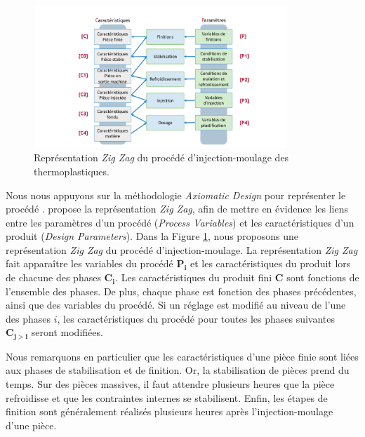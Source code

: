 \begin{figure}[hbtp]
	\centering
	\includegraphics[width=0.85\textwidth,height=\textheight,keepaspectratio]{../Chap1/Figures/Sapristi_ZigZag.pdf}
	\caption{Représentation \textit{Zig Zag} du procédé d'injection-moulage des thermoplastiques.}
	\label{fig:zigzag}
\end{figure}

Nous nous appuyons sur la méthodologie \textit{Axiomatic Design} pour représenter le procédé \cite{suh_principles_1990}.
\citeauthor{suh_principles_1990} propose la représentation \textit{Zig Zag}, afin de mettre en évidence les liens entre les paramètres d'un procédé (\textit{Process Variables}) et les caractéristiques d'un produit (\textit{Design Parameters}).
Dans la Figure \ref{fig:zigzag}, nous proposons une représentation \textit{Zig Zag} du procédé d'injection-moulage.
La représentation \textit{Zig Zag} fait apparaître les variables du procédé $\boldsymbol{P_i}$ et les caractéristiques du produit lors de chacune des phases $\boldsymbol{C_i}$.
Les caractéristiques du produit fini $\boldsymbol{C}$ sont fonctions de l’ensemble des phases.
De plus, chaque phase est fonction des phases précédentes, ainsi que des variables du procédé.
Si un réglage est modifié au niveau de l’une des phases $i$, les caractéristiques du procédé pour toutes les phases suivantes $\boldsymbol{C_{j>i}}$ seront modifiées.

Nous remarquons en particulier que les caractéristiques d'une pièce finie sont liées aux phases de stabilisation et de finition.
Or, la stabilisation de pièces prend du temps.
Sur des pièces massives, il faut attendre plusieurs heures que la pièce refroidisse et que les contraintes internes se stabilisent.
Enfin, les étapes de finition sont généralement réalisés plusieurs heures après l'injection-moulage d'une pièce.


